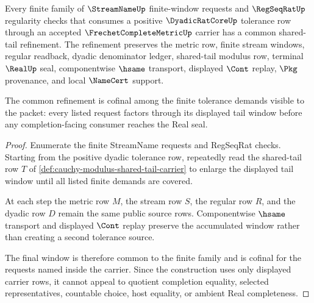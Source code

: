 \begin{theorem}
\label{thm:cauchy-modulus-shared-tail-cofinality}
Every finite family of $\StreamNameUp$ finite-window requests and $\RegSeqRatUp$ regularity checks that consumes a positive $\DyadicRatCoreUp$ tolerance row through an accepted $\FrechetCompleteMetricUp$ carrier has a common shared-tail refinement. The refinement preserves the metric row, finite stream windows, regular readback, dyadic denominator ledger, shared-tail modulus row, terminal $\RealUp$ seal, componentwise $\hsame$ transport, displayed $\Cont$ replay, $\Pkg$ provenance, and local $\NameCert$ support.

The common refinement is cofinal among the finite tolerance demands visible to the packet: every listed request factors through its displayed tail window before any completion-facing consumer reaches the Real seal.
\end{theorem}
\begin{proof}
Enumerate the finite StreamName requests and RegSeqRat checks. Starting from the positive dyadic tolerance row, repeatedly read the shared-tail row $T$ of \autoref{def:cauchy-modulus-shared-tail-carrier} to enlarge the displayed tail window until all listed finite demands are covered.

At each step the metric row $M$, the stream row $S$, the regular row $R$, and the dyadic row $D$ remain the same public source rows. Componentwise $\hsame$ transport and displayed $\Cont$ replay preserve the accumulated window rather than creating a second tolerance source.

The final window is therefore common to the finite family and is cofinal for the requests named inside the carrier. Since the construction uses only displayed carrier rows, it cannot appeal to quotient completion equality, selected representatives, countable choice, host equality, or ambient Real completeness.
\end{proof}

